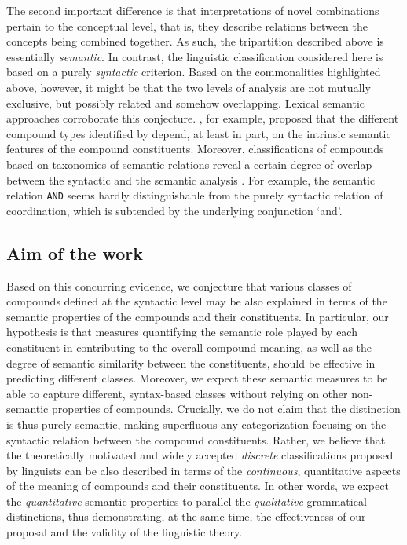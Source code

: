 \documentclass[output=paper]{langsci/langscibook}
\begin{document}
The second important difference is that interpretations of novel combinations pertain to the conceptual level, that is, they describe relations between the concepts being combined together. As such, the tripartition described above is essentially \emph{semantic}. In contrast, the linguistic classification considered here is based on a purely \emph{syntactic} criterion. Based on the commonalities highlighted above, however, it might be that the two levels of analysis are not mutually exclusive, but possibly related and somehow overlapping. Lexical semantic approaches corroborate this conjecture. \cite{lieber5OHC}, for example, proposed that the different compound types identified by \cite{SB2005} depend, at least in part, on the intrinsic semantic features of the compound constituents. Moreover, classifications of compounds based on taxonomies of semantic relations reveal a certain degree of overlap between the syntactic and the semantic analysis \citep{levi1978}. For example, the semantic relation \texttt{AND} seems hardly distinguishable from the purely syntactic relation of coordination, which is subtended by the underlying conjunction `and'.

\subsection{Aim of the work}

Based on this concurring evidence, we conjecture that various classes of compounds defined at the syntactic level may be also explained in terms of the semantic properties of the compounds and their constituents. In particular, our hypothesis is that measures quantifying the semantic role played by each constituent in contributing to the overall compound meaning, as well as the degree of semantic similarity between the constituents, should be effective in predicting different classes. Moreover, we expect these semantic measures to be able to capture different, syntax-based classes without relying on other non-semantic properties of compounds. Crucially, we do not claim that the distinction is thus purely semantic, making superfluous any categorization focusing on the syntactic relation between the compound constituents. Rather, we believe that the theoretically motivated and widely accepted \emph{discrete} classifications proposed by linguists can be also described in terms of the \emph{continuous}, quantitative aspects of the meaning of compounds and their constituents. In other words, we expect the \emph{quantitative} semantic properties to parallel the \emph{qualitative} grammatical distinctions, thus demonstrating, at the same time, the effectiveness of our proposal and the validity of the linguistic theory.
\end{document}
